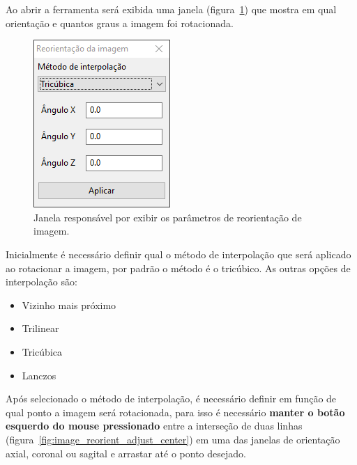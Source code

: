 Ao abrir a ferramenta será exibida uma janela (figura~\ref{fig:image_reorient_window}) que mostra em qual orientação e quantos graus a imagem foi rotacionada.

\begin{figure}[!htbp]
\centering
\includegraphics[scale=0.65]{../user_guide_figures/invesalius_screen/image_reorient_window_pt.png}
\caption{Janela responsável por exibir os parâmetros de reorientação de imagem.}
\label{fig:image_reorient_window}
\end{figure}

\newpage

Inicialmente é necessário definir qual o método de interpolação que será aplicado ao rotacionar a imagem, por padrão o método é o tricúbico. As outras opções de interpolação são:

\begin{itemize}
	\item Vizinho mais próximo
	\item Trilinear
	\item Tricúbica
	\item Lanczos
\end{itemize}

Após selecionado o método de interpolação, é necessário definir em função de qual ponto a imagem será rotacionada, para isso é necessário \textbf{manter o botão esquerdo do mouse pressionado} entre a interseção de duas linhas (figura~\ref{fig:image_reorient_adjust_center}) em uma das janelas de orientação axial, coronal ou sagital e arrastar até o ponto desejado.

